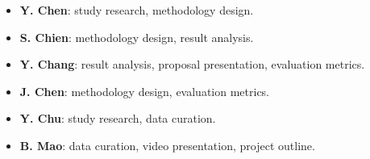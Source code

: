 \documentclass[conference]{IEEEtran}
\begin{document}
\begin{itemize}
  \item \textbf{Y. Chen}: study research, methodology design.
  \item \textbf{S. Chien}: methodology design, result analysis.
  \item \textbf{Y. Chang}: result analysis, proposal presentation, evaluation metrics.
  \item \textbf{J. Chen}: methodology design, evaluation metrics.
  \item \textbf{Y. Chu}: study research, data curation.
  \item \textbf{B. Mao}: data curation, video presentation, project outline.
\end{itemize}



\end{document}
